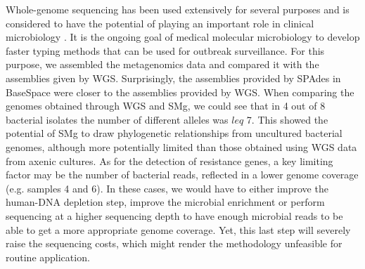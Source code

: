 Whole-genome sequencing has been used extensively for several purposes \citep{deurenberg_application_2017} and is considered to have the potential of playing an important role in clinical microbiology \citep{rossen_practical_2018}. It is the ongoing goal of medical molecular microbiology to develop faster typing methods that can be used for outbreak surveillance. For this purpose, we assembled the metagenomics data and compared it with the assemblies given by WGS. Surprisingly, the assemblies provided by SPAdes in BaseSpace were closer to the assemblies provided by WGS. When comparing the genomes obtained through WGS and SMg, we could see that in 4 out of 8 bacterial isolates the number of different alleles was $leq$ 7. This showed the potential of SMg to draw phylogenetic relationships from uncultured bacterial genomes, although more potentially limited than those obtained using WGS data from axenic cultures. As for the detection of resistance genes, a key limiting factor may be the number of bacterial reads, reflected in a lower genome coverage (e.g. samples 4 and 6). In these cases, we would have to either improve the human-DNA depletion step, improve the microbial enrichment or perform sequencing at a higher sequencing depth to have enough microbial reads to be able to get a more appropriate genome coverage. Yet, this last step will severely raise the sequencing costs, which might render the methodology unfeasible for routine application.

